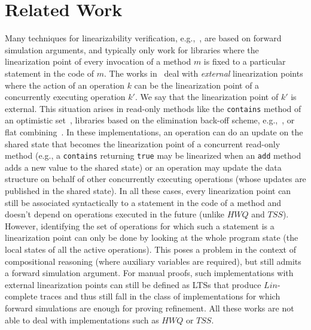 \vspace{-3.5mm}
\section{Related Work}
\vspace{-1.5mm}
Many techniques for linearizability verification, e.g.,~\cite{conf/ppopp/VafeiadisHHS06,conf/cav/AmitRRSY07,conf/vmcai/Vafeiadis09,conf/tacas/AbdullaHHJR13}, are based on forward simulation arguments, and typically only work for libraries where the linearization point of every invocation of a method $m$ is fixed to a particular statement in the code of $m$. The works in~\cite{conf/cav/Vafeiadis10,Derrick2011,conf/cav/DragoiGH13,DBLP:conf/cav/ZhuPJ15} deal with \emph{external} linearization points where the action of an operation $k$ can be the linearization point of a concurrently executing operation $k'$. We say that the linearization point of $k'$ is external. This situation arises in read-only methods like the {\tt contains} method of an optimistic set~\cite{conf/podc/OHearnRVYY10}, libraries based on the elimination back-off scheme, e.g.,~\cite{conf/spaa/HendlerSY04}, or flat combining~\cite{DBLP:conf/spaa/HendlerIST10,DBLP:conf/podc/GorelikH13}. 
In these implementations, an operation can do an update on the shared state that becomes the linearization point of a concurrent read-only method (e.g., a {\tt contains} returning {\tt true} may be linearized when an {\tt add} method adds a new value to the shared state) or an operation may update the data structure on behalf of other concurrently executing operations (whose updates are published in the shared state). In all these cases, every linearization point can still be associated syntactically to a statement in the code of a method and doesn't depend on operations executed in the future (unlike $\mathit{HWQ}$ and $\mathit{TSS}$). However, identifying the set of operations for which such a statement is a linearization point can only be done by looking at the whole program state (the local states of all the active operations). This poses a problem in the context of compositional reasoning (where auxiliary variables are required), but still admits a forward simulation argument. For manual proofs, such implementations with external linearization points can still be defined as LTSs that produce $Lin$-complete traces and thus still fall in the class of implementations for which forward simulations are enough for proving refinement. All these works are not able to deal with implementations such as $\mathit{HWQ}$ or $\mathit{TSS}$.

